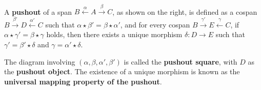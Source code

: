 \begin{definition}
    \label{def:cat:po}
    \ \newline
\noindent
\begin{minipage}{0.7\textwidth}  
    A \textbf{pushout} of a span \( B \overset{\alpha}{\leftarrow} A \overset{\beta}{\rightarrow} C \), as shown on the right, is defined as a cospan \( B \overset{\beta'}{\rightarrow} D \overset{\alpha'}{\leftarrow} C \) such that \( \alpha \star \beta' = \beta \star \alpha' \), and for every cospan \( B \overset{\gamma'}{\rightarrow} E \overset{\gamma}{\leftarrow} C \), if \( \alpha \star \gamma' = \beta \star \gamma \) holds, then there exists a unique morphism \(\delta : D \to E\) such that \( \gamma' = \beta' \star \delta \) and \( \gamma = \alpha' \star \delta \).
\end{minipage}
\hfill
\begin{minipage}{0.299\textwidth}
    \hfill
{}
\end{minipage}
The diagram involving \( (\alpha, \beta, \alpha', \beta') \) is called the \textbf{pushout square}, with \(D\) as the \textbf{pushout object}. The existence of a unique morphism is known as the \textbf{universal mapping property of the pushout}.
\end{definition} 

